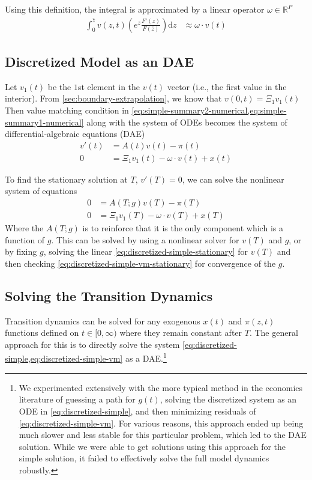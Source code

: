 \documentclass[11pt]{article}
\newcommand{\R}{\ensuremath{\mathbb{R}}}
\newcommand{\diff}{\ensuremath{\mathrm{d}}}
\begin{document}
\noindent Using this definition, the integral is approximated by a linear operator $\omega\in\R^P$
\begin{align}
 \int_{0}^{\bar{z}}  v(z,t) \left(e^z \frac{F'(z)}{F(\bar{z})}\right) \diff z &\approx \omega \cdot v(t)
\end{align}

\subsection{Discretized Model as an DAE}
Let $v_1(t)$ be the $1$st element in the $v(t)$ vector (i.e., the first value in the interior).  From \cref{sec:boundary-extrapolation}, we know that $v(0, t) = \Xi_1 v_1(t)$  Then value matching condition in \cref{eq:simple-summary2-numerical,eq:simple-summary1-numerical} along with the system of ODEs becomes the system of differential-algebraic equations (DAE)
\begin{align}
	v'(t) &= A(t) v(t) - \pi(t)\label{eq:discretized-simple}\\
	0 &= \Xi_1 v_1(t) - \omega \cdot v(t) + x(t)\label{eq:discretized-simple-vm}
\end{align}


\noindent To find the stationary solution at $T$,  $v'(T) = 0$, we can solve the nonlinear system of equations
\begin{align}
	0 &= A(T; g) v(T) - \pi(T)\label{eq:discretized-simple-stationary}\\
	0 &= \Xi_1 v_1(T) - \omega \cdot v(T) + x(T)\label{eq:discretized-simple-vm-stationary}
\end{align}
Where the $ A(T; g)$ is to reinforce that it is the only component which is a function of $g$.  This can be solved by using a nonlinear solver for $v(T)$ and $g$, or by fixing $g$, solving the linear \cref{eq:discretized-simple-stationary} for $v(T)$ and then checking \cref{eq:discretized-simple-vm-stationary} for convergence of the $g$.

\subsection{Solving the Transition Dynamics}

Transition dynamics can be solved for any exogenous $x(t)$ and $\pi(z,t)$ functions defined on $t \in [0,\infty)$ where they remain constant after $T$.  The general approach  for this is to directly solve the system \cref{eq:discretized-simple,eq:discretized-simple-vm} as a DAE.\footnote{ We experimented extensively with the more typical method in the economics literature of guessing a path for $g(t)$, solving the discretized system as an ODE in \cref{eq:discretized-simple}, and then minimizing residuals of \cref{eq:discretized-simple-vm}.  For various reasons, this approach ended up being much slower and less stable for this particular problem, which led to the DAE solution.  While we were able to get solutions using this approach for the simple solution, it failed to effectively solve the full model dynamics robustly.}
\end{document}
